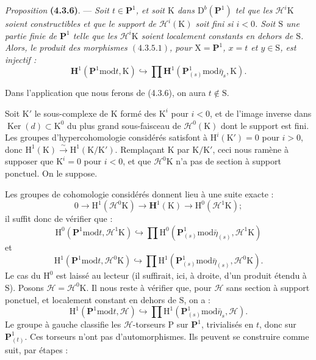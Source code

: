 \documentclass[11pt,leqno]{article}
\begin{document}
\textit{Proposition} \textbf{(4.3.6)}. — \textit{Soit \(t\in\mathbf{P}^1\), et soit \(\mathrm{K}\) dans \(\mathrm{D}^b(\mathbf{P}^1)\) tel que les \(\mathscr{H}^i\mathrm{K}\) soient constructibles et que le support de \(\mathscr{H}^i(\mathrm{K})\) soit fini si \(i<0\). Soit \(\mathrm{S}\) une partie finie de \(\mathbf{P}^1\) telle que les \(\mathscr{H}^i\mathrm{K}\) soient localement constants en dehors de \(\mathrm{S}\). Alors, le produit des morphismes \((4.3.5.1)\), pour \(\mathrm{X}=\mathbf{P}^1\), \(x=t\) et \(y\in\mathrm{S}\), est injectif :}
\[
\mathbf{H}^1(\mathbf{P}^1\mathbin{\mathrm{mod}}t,\mathrm{K})
\hookrightarrow
\prod\mathbf{H}^1(\mathbf{P}^1_{(s)}\mathbin{\mathrm{mod}}\bar\eta_s,\mathrm{K}).
\]

Dans l’application que nous ferons de (4.3.6), on aura \(t\notin\mathrm{S}\).

Soit \(\mathrm{K}'\) le sous-complexe de \(\mathrm{K}\) formé des \(\mathrm{K}^i\) pour \(i<0\), et de l’image inverse dans \(\operatorname{Ker}(d)\subset\mathrm{K}^0\) du plus grand sous-faisceau de \(\mathscr{H}^0(\mathrm{K})\) dont le support est fini. Les groupes d’hypercohomologie considérés satisfont à \(\mathrm{H}^i(\mathrm{K}')=0\) pour \(i>0\), donc \(\mathrm{H}^1(\mathrm{K})\xrightarrow{\sim}\mathrm{H}^1(\mathrm{K}/\mathrm{K}')\). Remplaçant \(\mathrm{K}\) par \(\mathrm{K}/\mathrm{K}'\), ceci nous ramène à supposer que \(\mathrm{K}^i=0\) pour \(i<0\), et que \(\mathscr{H}^0\mathrm{K}\) n’a pas de section à support ponctuel. On le suppose.

Les groupes de cohomologie considérés donnent lieu à une suite exacte :
\[
0\to\mathrm{H}^1(\mathscr{H}^0\mathrm{K})
\to\mathbf{H}^1(\mathrm{K})
\to\mathrm{H}^0(\mathscr{H}^1\mathrm{K});
\]
il suffit donc de vérifier que :
\[
\mathrm{H}^0(\mathbf{P}^1\mathbin{\mathrm{mod}}t,\mathscr{H}^1\mathrm{K})
\hookrightarrow
\prod\mathrm{H}^0(\mathbf{P}^1_{(s)}\mathbin{\mathrm{mod}}\bar\eta_{(s)},\mathscr{H}^1\mathrm{K})
\]
et
\[
\mathrm{H}^1(\mathbf{P}^1\mathbin{\mathrm{mod}}t,\mathscr{H}^0\mathrm{K})
\hookrightarrow
\prod\mathrm{H}^1(\mathbf{P}^1_{(s)}\mathbin{\mathrm{mod}}\bar\eta_{(s)},\mathscr{H}^0\mathrm{K}).
\]
Le cas du \(\mathrm{H}^0\) est laissé au lecteur (il suffirait, ici, à droite, d’un produit étendu à \(\mathrm{S}\)). Posons \(\mathscr{H}=\mathscr{H}^0\mathrm{K}\). Il nous reste à vérifier que, pour \(\mathscr{H}\) sans section à support ponctuel, et localement constant en dehors de \(\mathrm{S}\), on a :
\[
\mathrm{H}^1(\mathbf{P}^1\mathbin{\mathrm{mod}}t,\mathscr{H})
\hookrightarrow
\prod\mathrm{H}^1(\mathbf{P}^1_{(s)}\mathbin{\mathrm{mod}}\bar\eta_s,\mathscr{H}).
\]
Le groupe à gauche classifie les \(\mathscr{H}\)-torseurs \(\mathrm{P}\) sur \(\mathbf{P}^1\), trivialisés en \(t\), donc sur \(\mathbf{P}^1_{(t)}\). Ces torseurs n’ont pas d’automorphismes. Ils peuvent se construire comme suit, par étapes :
\end{document}
